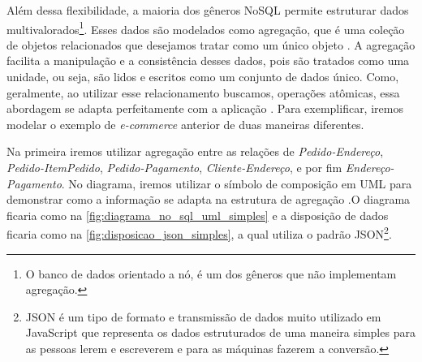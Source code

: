 Além dessa flexibilidade, a maioria dos gêneros NoSQL permite estruturar dados multivalorados\footnote{O banco de dados orientado a nó, é um dos gêneros que não implementam agregação.}. Esses dados são modelados como agregação, que é uma coleção de objetos relacionados que desejamos tratar como um único objeto \cite{domain-driven}. A agregação facilita a manipulação e a consistência desses dados, pois são tratados como uma unidade, ou seja, são lidos e escritos como um conjunto de dados único. Como, geralmente, ao utilizar esse relacionamento buscamos, operações atômicas, essa abordagem se adapta perfeitamente com a aplicação \cite{NoSQL}. Para exemplificar, iremos modelar o exemplo de
\textit{e-commerce} anterior de duas maneiras diferentes.

Na primeira iremos utilizar agregação entre as relações de \textit{Pedido-Endereço}, \textit{Pedido-ItemPedido}, \textit{Pedido-Pagamento}, \textit{Cliente-Endereço}, e por fim \textit{Endereço-Pagamento}. No diagrama, iremos utilizar o símbolo de composição em \ac{UML} para demonstrar como a informação se adapta na estrutura de agregação \cite{NoSQL}.O diagrama ficaria como na \autoref{fig:diagrama_no_sql_uml_simples} e a disposição de dados ficaria como na \autoref{fig:disposicao_json_simples}, a qual utiliza o padrão JSON\footnote{JSON é um tipo de formato e transmissão de dados muito utilizado em JavaScript que representa os dados estruturados de uma maneira simples para as pessoas lerem e escreverem e para as máquinas fazerem a conversão.}.

